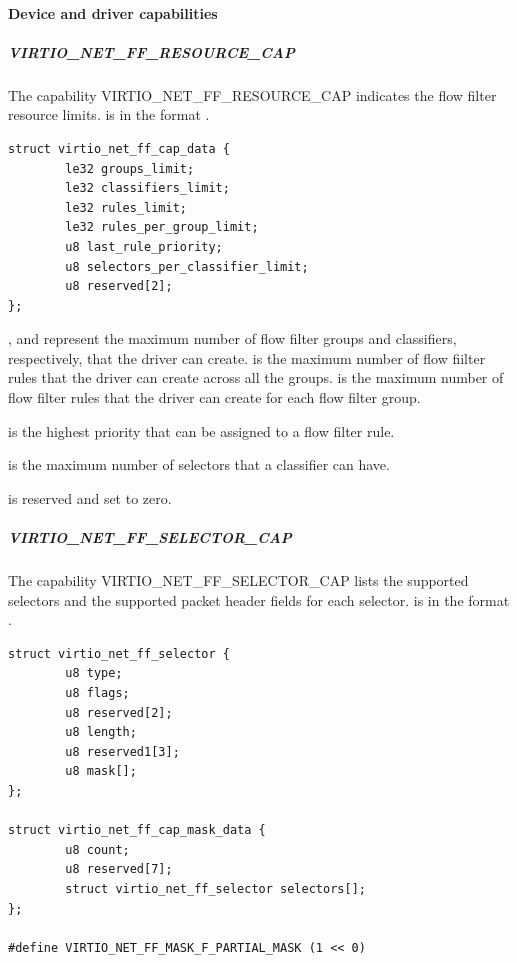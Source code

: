 \paragraph{Device and driver capabilities}
\label{par:Device Types / Network Device / Device Operation / Flow filter / Device and driver capabilities}

\subparagraph{VIRTIO_NET_FF_RESOURCE_CAP}
\label{par:Device Types / Network Device / Device Operation / Flow filter / Device and driver capabilities / VIRTIO-NET-FF-RESOURCE-CAP}

The capability VIRTIO_NET_FF_RESOURCE_CAP indicates the flow filter resource limits.
 is in the format
.

\begin{lstlisting}
struct virtio_net_ff_cap_data {
        le32 groups_limit;
        le32 classifiers_limit;
        le32 rules_limit;
        le32 rules_per_group_limit;
        u8 last_rule_priority;
        u8 selectors_per_classifier_limit;
        u8 reserved[2];
};
\end{lstlisting}

, and  represent the maximum
number of flow filter groups and classifiers, respectively, that the driver can create.
  is the maximum number of
flow fiilter rules that the driver can create across all the groups.
 is the maximum number of flow filter rules that the driver
can create for each flow filter group.

 is the highest priority that can be assigned to a
flow filter rule.

 is the maximum number of selectors
that a classifier can have.

 is reserved and set to zero.

\subparagraph{VIRTIO_NET_FF_SELECTOR_CAP}
\label{par:Device Types / Network Device / Device Operation / Flow filter / Device and driver capabilities / VIRTIO-NET-FF-SELECTOR-CAP}

The capability VIRTIO_NET_FF_SELECTOR_CAP lists the supported selectors and the
supported packet header fields for each selector.
 is in the format .

\begin{lstlisting}[label={lst:Device Types / Network Device / Device Operation / Flow filter / Device and driver capabilities / VIRTIO-NET-FF-SELECTOR-CAP / virtio-net-ff-selector}]
struct virtio_net_ff_selector {
        u8 type;
        u8 flags;
        u8 reserved[2];
        u8 length;
        u8 reserved1[3];
        u8 mask[];
};

struct virtio_net_ff_cap_mask_data {
        u8 count;
        u8 reserved[7];
        struct virtio_net_ff_selector selectors[];
};

#define VIRTIO_NET_FF_MASK_F_PARTIAL_MASK (1 << 0)
\end{lstlisting}

